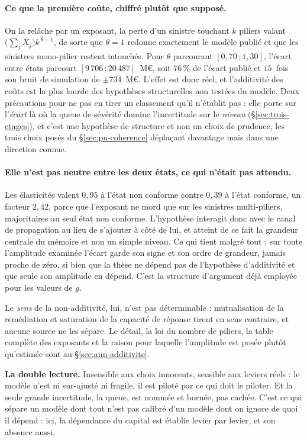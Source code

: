 \paragraph{Ce que la première coûte, chiffré plutôt que supposé.} On la relâche par un exposant, la
perte d'un sinistre touchant $k$ piliers valant $\bigl(\sum_j X_j\bigr)k^{\,\theta-1}$, de sorte que
$\theta=1$ redonne exactement le modèle publié et que les sinistres mono-pilier restent intouchés.
Pour $\theta$ parcourant $[0{,}70\,;1{,}30]$, l'écart entre états parcourt
$[9\,706\,;20\,487]$~M\euro, soit $76\,\%$ de l'écart publié et $15$~fois son bruit de simulation de
$\pm 734$~M\euro. L'effet est donc réel, et l'additivité des coûts est la plus lourde des
hypothèses structurelles non testées du modèle. Deux précautions pour ne pas en tirer un classement
qu'il n'établit pas : elle porte sur l'\emph{écart} là où la queue de sévérité domine l'incertitude
sur le \emph{niveau} (\S\ref{sec:trois-etages}), et c'est une hypothèse de structure et non un choix
de prudence, les trois choix posés du \S\ref{sec:pu-coherence} déplaçant davantage mais dans une
direction connue.

\paragraph{Elle n'est pas neutre entre les deux états, ce qui n'était pas attendu.} Les élasticités
valent $0{,}95$ à l'état non conforme contre $0{,}39$ à l'état conforme, un facteur $2{,}42$, parce
que l'exposant ne mord que sur les sinistres multi-piliers, majoritaires au seul état non conforme.
L'hypothèse interagit donc avec le canal de propagation au lieu de s'ajouter à côté de lui,
et atteint de ce fait la grandeur centrale du mémoire et non un simple niveau. Ce qui tient malgré
tout : sur toute l'amplitude examinée l'écart garde son signe et son ordre de grandeur, jamais
proche de zéro, si bien que la thèse ne dépend pas de l'hypothèse d'additivité et que seule son
amplitude en dépend. C'est la structure d'argument déjà employée pour les valeurs de $g$.

Le \emph{sens} de la non-additivité, lui, n'est pas déterminable : mutualisation de la remédiation
et saturation de la capacité de réponse tirent en sens contraire, et aucune source ne les sépare. Le
détail, la loi du nombre de piliers, la table complète des exposants et la raison pour laquelle
l'amplitude est posée plutôt qu'estimée sont au \S\ref{sec:ann-additivite}.

\vspace{2pt}


\begin{cle}
\textbf{La double lecture.} \og Insensible aux choix innocents, sensible aux leviers réels \fg :
le modèle n'est ni sur-ajusté ni fragile, il est piloté par ce qui doit le piloter.
Et la seule grande incertitude, la queue, est nommée et bornée, pas cachée. C'est ce qui
sépare un modèle dont tout n'est pas calibré d'un modèle dont on ignore de quoi il dépend :
ici, la dépendance du capital est établie levier par levier, et son absence aussi.
\end{cle}

